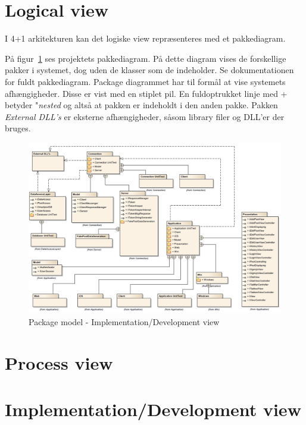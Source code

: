\section{Logical view}
I 4+1 arkitekturen kan det logiske view repræsenteres med et pakkediagram.

På figur~\ref{fig:packageDiagram} ses projektets pakkediagram. På dette diagram vises de forskellige pakker i systemet, dog uden de klasser som de indeholder. Se dokumentationen for fuldt pakkediagram.
Package diagrammet har til formål at vise systemets afhængigheder. Disse er vist med en stiplet pil. En fuldoptrukket linje med + betyder "\textit{nested} og altså at pakken er indeholdt i den anden pakke. Pakken \textit{External DLL's} er eksterne afhængigheder, såsom library filer og DLL'er der bruges.

\begin{landscape}
	\begin{figure}[H]
		\centering
		\includegraphics[width=\linewidth]{figs/arkitektur/packageDiagramNoImpl.PNG}
		\caption{Package model - Implementation/Development view}
		\label{fig:packageDiagram}
	\end{figure}
\end{landscape}

\section{Process view}

\section{Implementation/Development view}

